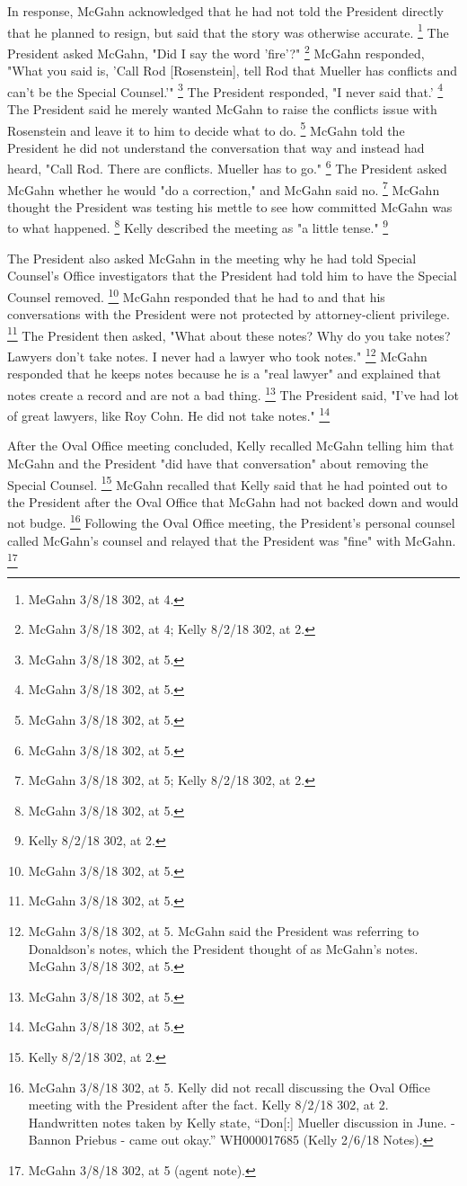 In response, McGahn acknowledged that he had not told the President directly that he planned to resign, but said that the story was otherwise accurate.%
\footnote{MeGahn 3/8/18 302, at 4.}
The President asked McGahn, "Did I say the word 'fire'?"%
\footnote{McGahn 3/8/18 302, at 4; Kelly 8/2/18 302, at 2.}
McGahn responded, "What you said is, 'Call Rod [Rosenstein], tell Rod that Mueller has conflicts and can't be the Special Counsel.'"%
\footnote{McGahn 3/8/18 302, at 5.}
The President responded, "I never said that.'%
\footnote{McGahn 3/8/18 302, at 5.}
The President said he merely wanted McGahn to raise the conflicts issue with Rosenstein and leave it to him to decide what to do.%
\footnote{McGahn 3/8/18 302, at 5.}
McGahn told the President he did not understand the conversation that way and instead had heard, "Call Rod.
There are conflicts.
Mueller has to go."%
\footnote{McGahn 3/8/18 302, at 5.}
The President asked McGahn whether he would "do a correction," and McGahn said no.%
\footnote{McGahn 3/8/18 302, at 5; Kelly 8/2/18 302, at 2.}
McGahn thought the President was testing his mettle to see how committed McGahn was to what happened.%
\footnote{McGahn 3/8/18 302, at 5.}
Kelly described the meeting as "a little tense."%
\footnote{Kelly 8/2/18 302, at 2.}

The President also asked McGahn in the meeting why he had told Special Counsel's Office investigators that the President had told him to have the Special Counsel removed.%
\footnote{McGahn 3/8/18 302, at 5.}
McGahn responded that he had to and that his conversations with the President were not protected by attorney-client privilege.%
\footnote{McGahn 3/8/18 302, at 5.}
The President then asked, "What about these notes? Why do you take notes? Lawyers don't take notes.
I never had a lawyer who took notes."%
\footnote{McGahn 3/8/18 302, at 5.
McGahn said the President was referring to Donaldson’s notes, which the President thought of as McGahn’s notes.
McGahn 3/8/18 302, at 5.}
McGahn responded that he keeps notes because he is a "real lawyer" and explained that notes create a record and are not a bad thing.%
\footnote{McGahn 3/8/18 302, at 5.}
The President said, "I've had lot of great lawyers, like Roy Cohn.
He did not take notes."%
\footnote{McGahn 3/8/18 302, at 5.}

After the Oval Office meeting concluded, Kelly recalled McGahn telling him that McGahn and the President "did have that conversation" about removing the Special Counsel.%
\footnote{Kelly 8/2/18 302, at 2.}
McGahn recalled that Kelly said that he had pointed out to the President after the Oval Office that McGahn had not backed down and would not budge.%
\footnote{McGahn 3/8/18 302, at 5.
Kelly did not recall discussing the Oval Office meeting with the President after the fact.
Kelly 8/2/18 302, at 2.
Handwritten notes taken by Kelly state, “Don[:] Mueller discussion in June. - Bannon Priebus - came out okay.”
WH000017685 (Kelly 2/6/18 Notes).}
Following the Oval Office meeting, the President's personal counsel called McGahn's counsel and relayed that the President was "fine" with McGahn.%
\footnote{McGahn 3/8/18 302, at 5 (agent note).}

